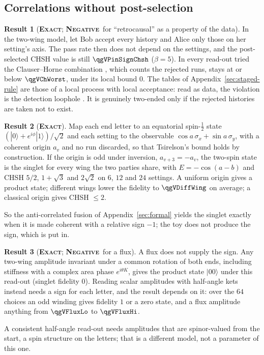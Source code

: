 \documentclass[11pt]{article}
\newcommand{\exact}{\textbf{\textsc{Exact}}}
\newcommand{\negres}{\textbf{\textsc{Negative}}}
\theoremstyle{definition}
\newtheorem{result}{Result}
\begin{document}
\subsection{Correlations without post-selection}\label{sec:second-quantum}
\begin{result}[\exact; \negres\ for ``retrocausal'' as a property of the data]\label{res:ch}
In the two-wing model, let Bob accept every history and Alice only those on her setting's axis. The pass rate then does not depend on the settings, and the post-selected CHSH value is still $\qgVPinSignChsh$ ($\beta=5$). In every read-out tried the Clauser--Horne combination \cite{clauserhorne1974}, which counts the rejected runs, stays at or below $\qgVChWorst$, under its local bound $0$. The tables of Appendix~\ref{sec:staged-rule} are those of a local process with local acceptance: read as data, the violation is the detection loophole \cite{pearle1970}. It is genuinely two-ended only if the rejected histories are taken not to exist.
\end{result}
\begin{result}[\exact]\label{res:singlet}
Map each end letter to an equatorial spin-$\tfrac12$ state $(|0\rangle+e^{i\phi}|1\rangle)/\sqrt2$ and each setting to the observable $\cos a\,\sigma_x+\sin a\,\sigma_y$, with a coherent origin $a_v$ and no run discarded, so that Tsirelson's bound holds by construction. If the origin is odd under inversion, $a_{v+3}=-a_v$, the two-spin state is the singlet for every wing the two parties share, with $E=-\cos(a-b)$ and CHSH $5/2$, $1+\sqrt3$ and $2\sqrt2$ on $6$, $12$ and $24$ settings. A uniform origin gives a product state; different wings lower the fidelity to $\qgVDiffWing$ on average; a classical origin gives CHSH $\le2$.
\end{result}
So the anti-correlated fusion of Appendix~\ref{sec:formal} yields the singlet exactly when it is made coherent with a relative sign $-1$; the toy does not produce the sign, which is put in.
\begin{result}[\exact; \negres\ for a flux]\label{res:noflux}
A flux does not supply the sign. Any two-wing amplitude invariant under a common rotation of both ends, including stiffness with a complex area phase $e^{i\theta K}$, gives the product state $|00\rangle$ under this read-out (singlet fidelity $0$). Reading scalar amplitudes with half-angle kets instead needs a sign for each letter, and the result depends on it: over the $64$ choices an odd winding gives fidelity $1$ or a zero state, and a flux amplitude anything from $\qgVFluxLo$ to $\qgVFluxHi$.
\end{result}
A consistent half-angle read-out needs amplitudes that are spinor-valued from the start, a spin structure on the letters; that is a different model, not a parameter of this one.
\end{document}
